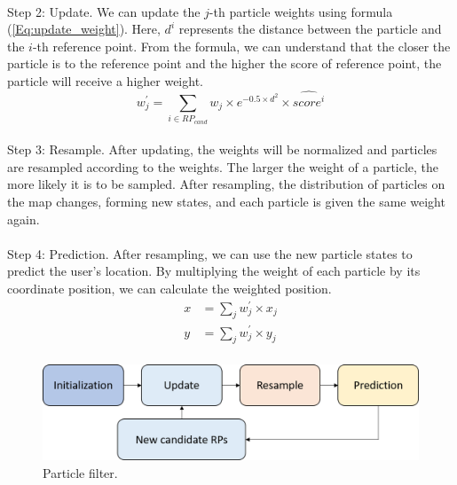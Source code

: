 \documentclass[a4paper,12pt]{report}
\begin{document}
\paragraph{}
Step 2: Update. We can update the $j$-th particle weights using formula (\ref{Eq:update_weight}). Here, $d^i$ represents the distance between the particle and the $i$-th reference point. From the formula, we can understand that the closer the particle is to the reference point and the higher the score of reference point, the particle will receive a higher weight.
\begin{equation}
    \label{Eq:update_weight}
    w_j^{'}=\sum_{i\in RP_{cand}}{w_j\times {e^{-0.5\times d^2}} \times \hat{score^i}}
\end{equation}
\paragraph{}
Step 3: Resample. After updating, the weights will be normalized and particles are resampled according to the weights. The larger the weight of a particle, the more likely it is to be sampled. After resampling, the distribution of particles on the map changes, forming new states, and each particle is given the same weight again.
\paragraph{}
Step 4: Prediction. After resampling, we can use the new particle states to predict the user's location. By multiplying the weight of each particle by its coordinate position, we can calculate the weighted position.
\begin{align}
    \label{Eq:position_calculation}
    x&=\sum_j{w_j^{'}\times x_j} \\
    y&=\sum_j{w_j^{'}\times y_j}
\end{align}
\paragraph{}
\begin{figure}[h]
    \centering
    \includegraphics[width=0.8\columnwidth]{images/chap3/pf.png}
    \caption{Particle filter.}
    \label{Fig:pf}
\end{figure}
\end{document}
